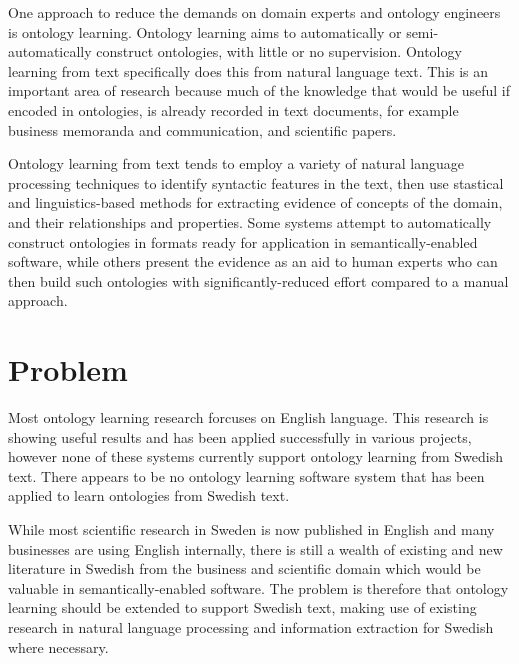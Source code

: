 \documentclass[a4paper]{report}
\newcommand{\todo}[1]{}
\begin{document}
One approach to reduce the demands on domain experts and ontology engineers is ontology learning.
Ontology learning aims to automatically or semi-automatically construct ontologies, with little or no supervision.
Ontology learning from text specifically does this from natural language text.
This is an important area of research because much of the knowledge that would be useful if encoded in ontologies, is already recorded in text documents, for example business memoranda and communication, and scientific papers.

Ontology learning from text tends to employ a variety of natural language processing techniques to identify syntactic features in the text, then use stastical and linguistics-based methods for extracting evidence of concepts of the domain, and their relationships and properties.
Some systems attempt to automatically construct ontologies in formats ready for application in semantically-enabled software, while others present the evidence as an aid to human experts who can then build such ontologies with significantly-reduced effort compared to a manual approach.

\section{Problem}
\label{sec:intro:problem}

Most ontology learning research forcuses on English language.
This research is showing useful results and has been applied successfully in various projects, however none of these systems currently support ontology learning from Swedish text.
There appears to be no ontology learning software system that has been applied to learn ontologies from Swedish text.
\todo{Hjelm's thesis\cite{Hjelm09Thesis} learnt a "prototypal" ontology from several languages including swedish.
We can learn a bit from it, but he used terms from an existing ontology, and we need to check if the relations they learnt are applicable.}
While most scientific research in Sweden is now published in English and many businesses are using English internally, there is still a wealth of existing and new literature in Swedish from the business and scientific domain which would be valuable in semantically-enabled software.
The problem is therefore that ontology learning should be extended to support Swedish text, making use of existing research in natural language processing and information extraction for Swedish where necessary.
 
\end{document}
